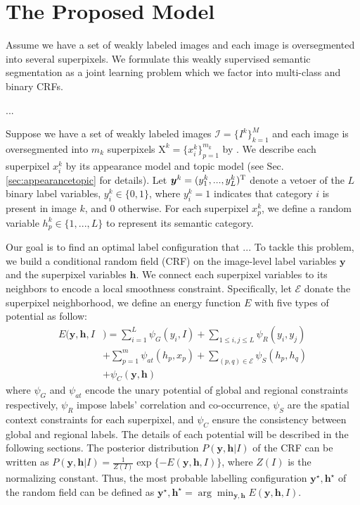 
\section{The Proposed Model}
Assume we have a set of weakly labeled images and each image is oversegmented into several superpixels.
We formulate this weakly supervised semantic segmentation as a joint learning problem which we factor into multi-class and binary CRFs.

...

Suppose we have a set of weakly labeled images $\mathcal{I}=\{I^k\}_{k=1}^M$ and each image is oversegmented into $m_k$ superpixels $\mathrm{X}^k=\{x_i^k\}_{p=1}^{m_k}$ by \cite{arbelaez2014multiscale}.  We describe each superpixel $x_i^k$ by its appearance model and topic model (see Sec. \ref{sec:appearancetopic} for details). Let $\boldsymbol{y}^k = (y_1^k,...,y_L^k)^{\rm T}$ denote  a vetoer of the $L$ binary label variables, \ie $y_i^k \in \{0,1\}$, where $y_i^k=1$ indicates that category $i$ is present in image $k$, and $0$ otherwise. For each superpixel $x_p^k$, we define a random variable $h_p^k \in \{1,...,L\}$ to represent its semantic category.


Our goal is to find an optimal label configuration that ... To tackle this problem, we build a conditional random field (CRF) on the image-level label variables $\boldsymbol{y}$ and the superpixel variables $\boldsymbol{h}$. We connect each superpixel variables to its neighbors to encode a local smoothness constraint. Specifically, let $\mathcal{E}$ donate the superpixel neighborhood, we define an energy function $E$ with five types of potential as follow:
\begin{equation}
    \label{eq:energyfunction}
    \begin{aligned}
        E(\boldsymbol{y},\boldsymbol{h},I&) = \sum_{i=1}^L{\psi_{G}(y_i,I)}
                            + \sum_{1 \le i,j \le L} {\psi_{R}(y_i,y_j)}\\ &+ \sum_{p=1}^{m}{\psi_{at}(h_p,x_p)}+ \sum_{(p,q) \in \mathcal{E}}{\psi_{S}(h_p,h_q)}\\ &+ \psi_{C}(\boldsymbol{y},\boldsymbol{h})
    \end{aligned}
\end{equation}
where $\psi_G$ and $\psi_{at}$ encode the unary potential of global and regional constraints respectively, $\psi_R$ impose labels' correlation and co-occurrence, $\psi_S$ are the spatial context constraints for each superpixel, and $\psi_C$ ensure the consistency between global and regional labels. The details of each potential will be described in the following sections. The posterior distribution $P(\boldsymbol{y},\boldsymbol{h}|I)$ of the CRF can be written as $P(\boldsymbol{y},\boldsymbol{h}|I) = \frac{1}{Z(I)}\exp{\{-E(\boldsymbol{y},\boldsymbol{h},I)\}}$, where $Z(I)$ is the normalizing constant. Thus, the most probable labelling configuration $\boldsymbol{y}^{\star},\boldsymbol{h}^{\star}$ of the random field can be defined as  $\boldsymbol{y}^{\star},\boldsymbol{h}^{\star} = \arg \min_{\boldsymbol{y},\boldsymbol{h}} E(\boldsymbol{y},\boldsymbol{h},I)$.

